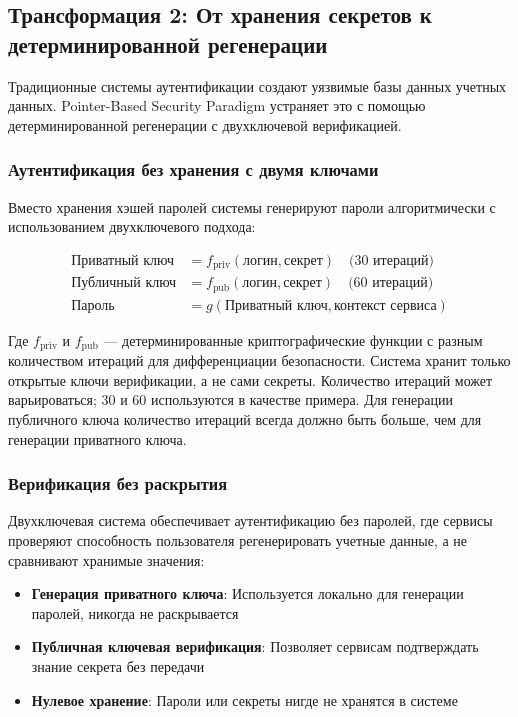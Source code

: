 \documentclass[11pt,a4paper]{article}
\begin{document}
\subsection{Трансформация 2: От хранения секретов к детерминированной регенерации}

Традиционные системы аутентификации создают уязвимые базы данных учетных данных. Pointer-Based Security Paradigm устраняет это с помощью детерминированной регенерации с двухключевой верификацией.

\subsubsection{Аутентификация без хранения с двумя ключами}

Вместо хранения хэшей паролей системы генерируют пароли алгоритмически с использованием двухключевого подхода:

\begin{align}
\text{Приватный ключ} &= f_{\text{priv}}(\text{логин}, \text{секрет}) \quad \text{(30 итераций)} \\
\text{Публичный ключ} &= f_{\text{pub}}(\text{логин}, \text{секрет}) \quad \text{(60 итераций)} \\
\text{Пароль} &= g(\text{Приватный ключ}, \text{контекст сервиса})
\end{align}

Где $f_{\text{priv}}$ и $f_{\text{pub}}$ — детерминированные криптографические функции с разным количеством итераций для дифференциации безопасности. Система хранит только открытые ключи верификации, а не сами секреты. Количество итераций может варьироваться; 30 и 60 используются в качестве примера. Для генерации публичного ключа количество итераций всегда должно быть больше, чем для генерации приватного ключа.

\subsubsection{Верификация без раскрытия}

Двухключевая система обеспечивает аутентификацию без паролей, где сервисы проверяют способность пользователя регенерировать учетные данные, а не сравнивают хранимые значения:

\begin{itemize}
    \item \textbf{Генерация приватного ключа}: Используется локально для генерации паролей, никогда не раскрывается
    \item \textbf{Публичная ключевая верификация}: Позволяет сервисам подтверждать знание секрета без передачи
    \item \textbf{Нулевое хранение}: Пароли или секреты нигде не хранятся в системе
\end{itemize}
\end{document}
